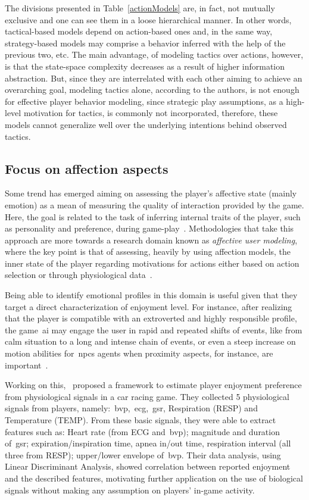 The divisions presented in Table~\ref{actionModels} are, in fact, not mutually exclusive and one can see them in a loose hierarchical manner. In other words, tactical-based models depend on action-based ones and, in the same way, strategy-based models may comprise a behavior inferred with the help of the previous two, etc. The main advantage, of modeling tactics over actions, however, is that the state-space complexity decreases as a result of higher information abstraction. But, since they are interrelated with each other aiming to achieve an overarching goal, modeling tactics alone, according to the authors, is not enough for effective player behavior modeling, since strategic play assumptions, as a high-level motivation for tactics, is commonly not incorporated, therefore, these models cannot generalize well over the underlying intentions behind observed tactics.

\subsection{Focus on affection aspects}\label{affectmodeling}
Some trend has emerged aiming on assessing the player's affective state (mainly emotion) as a mean of measuring the quality of interaction provided by the game. Here, the goal is related to the task of inferring internal traits of the player, such as personality and preference, during game-play~\citep{van_lankveld_psychologically_2009}. Methodologies that take this approach are more towards a research domain known as \textit{affective user modeling}, where the key point is that of assessing, heavily by using affection models, the inner state of the player regarding motivations for actions either based on action selection or through physiological data~\citep{van_lankveld_psychologically_2009}.

Being able to identify emotional profiles in this domain is useful given that they target a direct characterization of enjoyment level. For instance, after realizing that the player is compatible with an extroverted and highly responsible profile, the game~\gls{ai} may engage the user in rapid and repeated shifts of events, like from calm situation to a long and intense chain of events, or even a steep increase on motion abilities for~\glspl{npc} agents when proximity aspects, for instance, are important~\citep{bakkes_player_2012}.

Working on this,~\cite{tognetti_modeling_2010} proposed a framework to estimate player enjoyment preference from physiological signals in a car racing game. They collected 5 physiological signals from players, namely:~\gls{bvp},~\gls{ecg},~\gls{gsr}, Respiration (RESP) and Temperature (TEMP). From these basic signals, they were able to extract features such as: Heart rate (from ECG and~\gls{bvp}); magnitude and duration of~\gls{gsr}; expiration/inspiration time, apnea in/out time, respiration interval (all three from RESP); upper/lower envelope of~\gls{bvp}. Their data analysis, using Linear Discriminant Analysis, showed correlation between reported enjoyment and the described features, motivating further application on the use of biological signals without making any assumption on players' in-game activity.

